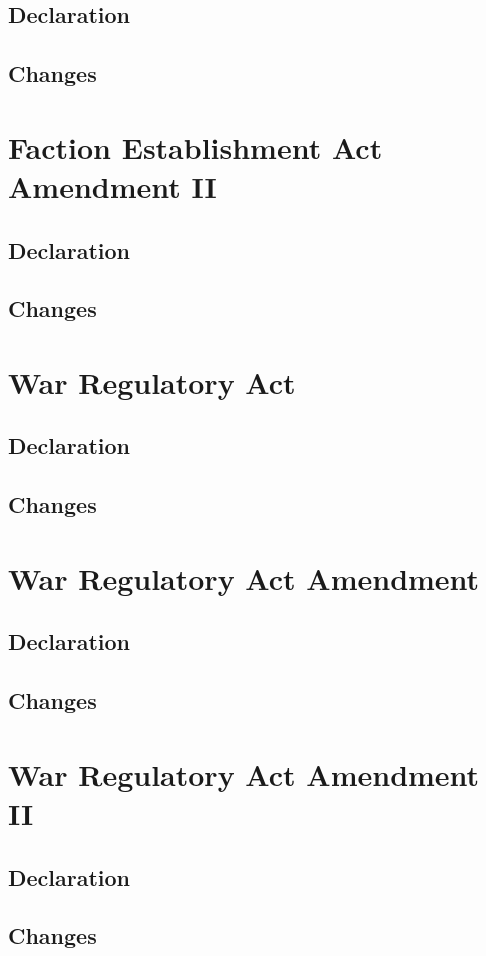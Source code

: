 \documentclass{cjs9}
\begin{document}
\subsection{Declaration}
\subsection{Changes}
\newpage
\section{Faction Establishment Act Amendment II}
\subsection{Declaration}
\subsection{Changes}
\newpage
\section{War Regulatory Act}
\subsection{Declaration}
\subsection{Changes}
\newpage
\section{War Regulatory Act Amendment}
\subsection{Declaration}
\subsection{Changes}
\newpage
\section{War Regulatory Act Amendment II}
\subsection{Declaration}
\subsection{Changes}
\end{document}

